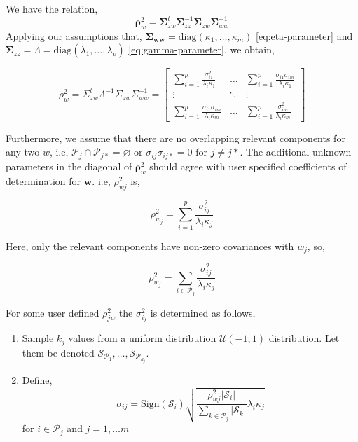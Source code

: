 \documentclass[review]{elsarticle}
\providecommand{\tightlist}{%
  \setlength{\itemsep}{0pt}\setlength{\parskip}{0pt}}
\theoremstyle{definition}
\theoremstyle{definition}
\theoremstyle{definition}
\theoremstyle{remark}
\begin{document}
We have the relation,
\[\boldsymbol{\rho}_w^2 = \boldsymbol{\Sigma}_{zw}^t\boldsymbol{\Sigma}_{zz}^{-1}\boldsymbol{\Sigma}_{zw}\boldsymbol{\Sigma}_{ww}^{-1}\]
Applying our assumptions that,
\(\boldsymbol{\Sigma_{ww}} = \text{diag}(\kappa_1, \ldots, \kappa_m)\)
\eqref{eq:eta-parameter} and
\(\boldsymbol{\Sigma}_{zz} = \Lambda = \text{diag}(\lambda_1, \ldots, \lambda_p)\)
\eqref{eq:gamma-parameter}, we obtain,

\[
  \rho_{w}^2 = \Sigma_{zw}^t\Lambda^{-1}\Sigma_{zw}\Sigma_{ww}^{-1} =
  \begin{bmatrix}
    \sum_{i = 1}^p\frac{\sigma_{i1}^2}{\lambda_i\kappa_1} & \ldots & \sum_{i=1}^p\frac{\sigma_{i1}\sigma_{im}}{\lambda_i\kappa_1} \\
    \vdots & \ddots & \vdots \\
    \sum_{i=1}^p\frac{\sigma_{i1}\sigma_{im}}{\lambda_i\kappa_m} & \ldots & \sum_{i = 1}^p\frac{\sigma_{im}^2}{\lambda_i\kappa_m}
  \end{bmatrix}
\]

Furthermore, we assume that there are no overlapping relevant components
for any two \(w\), i.e,
\(\mathcal{P}_j \cap \mathcal{P}_{j*} = \varnothing\) or
\(\sigma_{ij}\sigma_{ij*} = 0\) for \(j\ne j*\). The additional unknown
parameters in the diagonal of \(\boldsymbol{\rho}_w^2\) should agree
with user specified coefficients of determination for \(\mathbf{w}\).
i.e, \(\rho_{wj}^2\) is,

\[
\rho_{w_j}^2 = \sum_{i = 1}^p\frac{\sigma_{ij}^2}{\lambda_i\kappa_j}
\]

Here, only the relevant components have non-zero covariances with
\(w_j\), so,

\[
\rho_{w_j}^2 = \sum_{i \in \mathcal{P}_j} \frac{\sigma_{ij}^2}{\lambda_i\kappa_j}
\]

For some user defined \(\rho_{jw}^2\) the \(\sigma_{ij}^2\) is
determined as follows,

\begin{enumerate}
\def\labelenumi{\arabic{enumi}.}
\tightlist
\item
  Sample \(k_j\) values from a uniform distribution
  \(\mathcal{U}(-1, 1)\) distribution. Let them be denoted
  \(\mathcal{S}_{\mathcal{P}_1}, \ldots, \mathcal{S}_{\mathcal{P}_{k_j}}\).
\item
  Define,
  \[\sigma_{ij} = \text{Sign}(\mathcal{S}_i)\sqrt{\frac{\rho_{wj}^2\left|\mathcal{S}_i\right|}{\sum_{k\in\mathcal{P}_j}\left|\mathcal{S}_k\right|}\lambda_i\kappa_j}\]
  for \(i \in \mathcal{P}_j\) and \(j = 1, \ldots m\)
\end{enumerate}
\end{document}
